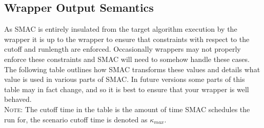 \documentclass[manual.tex]{subfiles}
\begin{document}
\subsection{Wrapper Output Semantics}

As SMAC is entirely insulated from the target algorithm execution by the wrapper it is up to the wrapper to 
ensure that constraints with respect to the cutoff and runlength are enforced. Occasionally wrappers may not properly enforce these constraints and SMAC will need to somehow handle these cases. The following table outlines how SMAC transforms these values and details what value is used in various parts of SMAC. In future versions some parts of this table may in fact change, and so it is best to ensure that your wrapper is well behaved.\\

 \textsc{Note}: The cutoff time in the table is the amount of time SMAC schedules the run for, the scenario cutoff time is denoted as $\kappa_{max}$.
\end{document}
